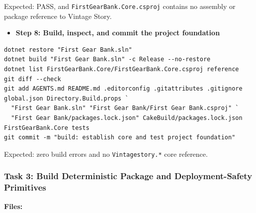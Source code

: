 \documentclass[
  10pt,
  letterpaper,
]{article}
\newcommand{\passthrough}[1]{#1}
\providecommand{\tightlist}{%
  \setlength{\itemsep}{0pt}\setlength{\parskip}{0pt}}
\begin{document}
Expected: PASS, and
\texttt{FirstGearBank.}\allowbreak{}\texttt{Core.}\allowbreak{}\texttt{csproj}
contains no assembly or package reference to Vintage Story.

\begin{itemize}
\tightlist
\item[$\square$]
  \textbf{Step 8: Build, inspect, and commit the project foundation}
\end{itemize}

\begin{lstlisting}
dotnet restore "First Gear Bank.sln"
dotnet build "First Gear Bank.sln" -c Release --no-restore
dotnet list FirstGearBank.Core/FirstGearBank.Core.csproj reference
git diff --check
git add AGENTS.md README.md .editorconfig .gitattributes .gitignore global.json Directory.Build.props `
  "First Gear Bank.sln" "First Gear Bank/First Gear Bank.csproj" `
  "First Gear Bank/packages.lock.json" CakeBuild/packages.lock.json FirstGearBank.Core tests
git commit -m "build: establish core and test project foundation"
\end{lstlisting}

Expected: zero build errors and no
\passthrough{\lstinline!Vintagestory.*!} core reference.

\subsubsection{Task 3: Build Deterministic Package and Deployment-Safety
Primitives}\label{task-3-build-deterministic-package-and-deployment-safety-primitives}

\textbf{Files:}
\end{document}
